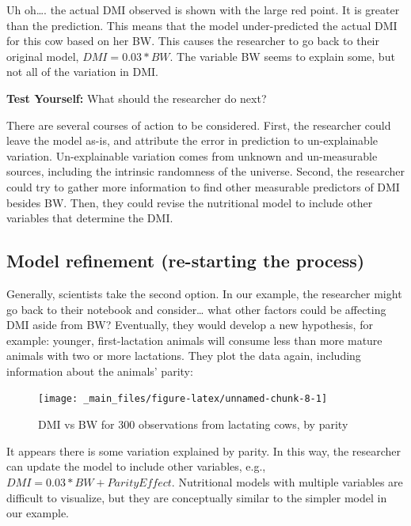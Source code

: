 \documentclass[
]{book}
\begin{document}
Uh oh\ldots. the actual DMI observed is shown with the large red point. It is greater than the prediction. This means that the model under-predicted the actual DMI for this cow based on her BW. This causes the researcher to go back to their original model, \(DMI = 0.03 * BW\). The variable BW seems to explain some, but not all of the variation in DMI.

\textbf{Test Yourself: }
What should the researcher do next?

There are several courses of action to be considered. First, the researcher could leave the model as-is, and attribute the error in prediction to un-explainable variation. Un-explainable variation comes from unknown and un-measurable sources, including the intrinsic randomness of the universe. Second, the researcher could try to gather more information to find other measurable predictors of DMI besides BW. Then, they could revise the nutritional model to include other variables that determine the DMI.

\hypertarget{model-refinement-re-starting-the-process}{%
\subsection{Model refinement (re-starting the process)}\label{model-refinement-re-starting-the-process}}

Generally, scientists take the second option. In our example, the researcher might go back to their notebook and consider\ldots{} what other factors could be affecting DMI aside from BW? Eventually, they would develop a new hypothesis, for example: younger, first-lactation animals will consume less than more mature animals with two or more lactations. They plot the data again, including information about the animals' parity:

\begin{figure}

{\centering \texttt{[image: \_main\_files/figure-latex/unnamed-chunk-8-1]} 

}

\caption{DMI vs BW for 300 observations from lactating cows, by parity}\label{fig:unnamed-chunk-8}
\end{figure}

It appears there is some variation explained by parity. In this way, the researcher can update the model to include other variables, e.g., \(DMI = 0.03 * BW + ParityEffect\). Nutritional models with multiple variables are difficult to visualize, but they are conceptually similar to the simpler model in our example.
\end{document}
